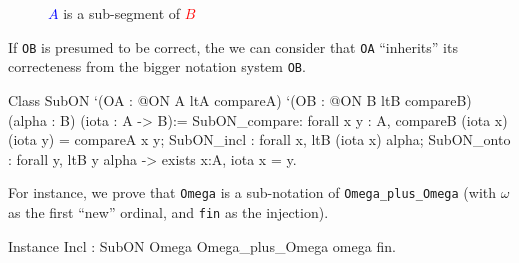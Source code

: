 \begin{figure}[h]
   \centering
   \caption{\textcolor{blue}{$A$} is a sub-segment  of \textcolor{red}{$B$}}
   \label{fig:subsegment}
 \end{figure}

If \texttt{OB} is presumed to be correct, the we can consider that \texttt{OA} ``inherits'' its correcteness from the bigger notation system \texttt{OB}.


\label{types:SubON}

\begin{Coqsrc}
Class  SubON 
       `(OA : @ON A ltA  compareA)
       `(OB : @ON B ltB  compareB)
       (alpha :  B)
       (iota : A -> B):=
  {
  SubON_compare: forall x y : A,  compareB (iota x) (iota y) =
                                 compareA x y;
  SubON_incl : forall x, ltB (iota x) alpha;
  SubON_onto : forall y, ltB y alpha  -> exists x:A, iota x = y}.
\end{Coqsrc}

For instance, we prove that \texttt{Omega} is a sub-notation of
\texttt{Omega\_plus\_Omega} (with $\omega$ as the first ``new'' ordinal, and \texttt{fin} as the injection).

\begin{Coqsrc}
Instance Incl : SubON Omega Omega_plus_Omega omega fin.
\end{Coqsrc}



